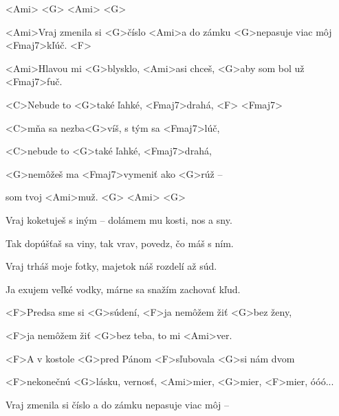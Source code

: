 


<Ami> <G> <Ami> <G>

\zs
<Ami>Vraj zmenila si <G>číslo <Ami>a do zámku <G>nepasuje viac môj <Fmaj7>kľúč. <F>

<Ami>Hlavou mi <G>blysklo, <Ami>asi chceš, <G>aby som bol už <Fmaj7>fuč.
\ks

\zr
<C>Nebude to <G>také ľahké, <Fmaj7>drahá, <F> <Fmaj7>

<C>mňa sa nezba<G>víš, s tým sa <Fmaj7>lúč,

<C>nebude to <G>také ľahké, <Fmaj7>drahá,

<G>nemôžeš ma <Fmaj7>vymeniť ako <G>rúž --

som tvoj <Ami>muž. <G> <Ami> <G>
\kr

\zs
Vraj koketuješ s iným -- dolámem mu kosti, nos a sny.

Tak dopúšťaš sa viny, tak vrav, povedz, čo máš s ním.
\ks

\zr \kr

\zs
Vraj trháš moje fotky, majetok náš rozdelí až súd.

Ja exujem veľké vodky, márne sa snažím zachovať kľud.
\ks

\zr \kr

\zs
<F>Predsa sme si <G>súdení, <F>ja nemôžem žiť <G>bez ženy,

<F>ja nemôžem žiť <G>bez teba, to mi <Ami>ver.

<F>A v kostole <G>pred Pánom <F>sľubovala <G>si nám dvom

<F>nekonečnú <G>lásku, vernosť, <Ami>mier, <G>mier, <F>mier, óóó...
\ks

\zr \kr

\zs
Vraj zmenila si číslo a do zámku nepasuje viac môj –
\ks

\kp
